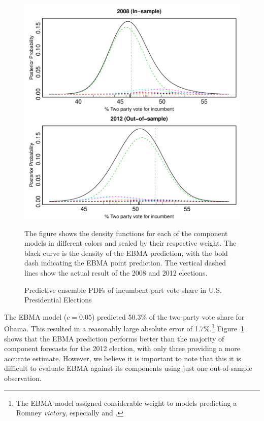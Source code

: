 \documentclass[12pt,fullpage,endnotes]{article}
\begin{document}
\begin{figure}[h]
\caption{Predictive ensemble PDFs of incumbent-part vote share in U.S. Presidential Elections}
\label{pres}
\begin{center}
\includegraphics[scale=.8]{presForecast}
\end{center}
The figure shows the density functions for each of the component
models in different colors and scaled by their respective weight. The black curve is the density of the EBMA
prediction, with the bold dash indicating the EBMA point
prediction. The vertical dashed lines show the actual result of the 2008 and 2012 elections.
\end{figure}


The EBMA model ($c=0.05$) predicted 50.3\% of the two-party vote share
for Obama.  This resulted in a reasonably large absolute error of
1.7\%.\footnote{The EBMA model assigned considerable weight to models
  predicting a Romney \textit{victory}, especially \citet{Hibbs:2012a}
  and \citet{LewisBeckTien:2012}.}  Figure~\ref{pres} shows that the
EBMA prediction performs better than the majority of component
forecasts for the 2012 election, with only three providing a more
accurate estimate. However, we believe it is important to note that
this it is difficult to evaluate EBMA against its components using
just one out-of-sample observation.
\end{document}
